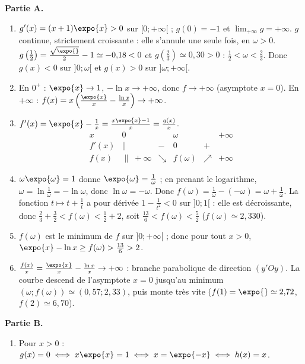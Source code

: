\begin{corrige}
\begin{sol}
\textbf{Partie A.}
\begin{enumerate}
\item $g'(x) = (x+1)\expo{x} > 0$ sur $[0;+\infty[$ ; $g(0) = -1$ et $\lim_{+\infty} g = +\infty$. $g$ continue, strictement croissante : elle s'annule une seule fois,
      en $\omega > 0$. $g\left(\frac{1}{2}\right) = \frac{\sqrt{\expo{}}}{2} - 1 \simeq -0{,}18 < 0$ et $g\left(\frac{2}{3}\right) \simeq 0{,}30 > 0$ : $\frac{1}{2} < \omega < \frac{2}{3}$.
      Donc $g(x) < 0$ sur $]0;\omega[$ et $g(x) > 0$ sur $]\omega;+\infty[$.
\item En $0^+$ : $\expo{x} \to 1$, $-\ln x \to +\infty$, donc $f \to +\infty$ (asymptote $x = 0$).
      En $+\infty$ : $f(x) = x\left(\frac{\expo{x}}{x} - \frac{\ln x}{x}\right) \to +\infty$.
\item $f'(x) = \expo{x} - \frac{1}{x} = \frac{x\expo{x} - 1}{x} = \frac{g(x)}{x}$.
      \[
      \begin{array}{c|ccccc}
      x & 0 & & \omega & & +\infty \\ \hline
      f'(x) & \| & - & 0 & + & \\ \hline
      f(x) & \| \; +\infty & \searrow & f(\omega) & \nearrow & +\infty
      \end{array}
      \]
\item $\omega\expo{\omega} = 1$ donne $\expo{\omega} = \frac{1}{\omega}$ ; en prenant le logarithme, $\omega = \ln\frac{1}{\omega} = -\ln\omega$, donc $\ln\omega = -\omega$.
      Donc $f(\omega) = \frac{1}{\omega} - (-\omega) = \omega + \frac{1}{\omega}$.
      La fonction $t \mapsto t + \frac{1}{t}$ a pour d\'eriv\'ee $1 - \frac{1}{t^2} < 0$ sur $]0;1[$ : elle est d\'ecroissante, donc
      $\frac{2}{3} + \frac{3}{2} < f(\omega) < \frac{1}{2} + 2$, soit $\boxed{\frac{13}{6} < f(\omega) < \frac{5}{2}}$ ($f(\omega) \simeq 2{,}330$).
\item $f(\omega)$ est le minimum de $f$ sur $]0;+\infty[$ ; donc pour tout $x > 0$, $\expo{x} - \ln x \geq f(\omega) > \frac{13}{6} > 2$.
\item $\frac{f(x)}{x} = \frac{\expo{x}}{x} - \frac{\ln x}{x} \to +\infty$ : branche parabolique de direction $(y'Oy)$.
      La courbe descend de l'asymptote $x = 0$ jusqu'au minimum $(\omega ; f(\omega)) \simeq (0{,}57 ; 2{,}33)$, puis monte tr\`es vite
      ($f(1) = \expo{} \simeq 2{,}72$, $f(2) \simeq 6{,}70$).
\end{enumerate}
\textbf{Partie B.}
\begin{enumerate}
\item Pour $x > 0$ : $g(x) = 0 \iff x\expo{x} = 1 \iff x = \expo{-x} \iff h(x) = x$.

\end{enumerate}
\end{sol}
\end{corrige}
